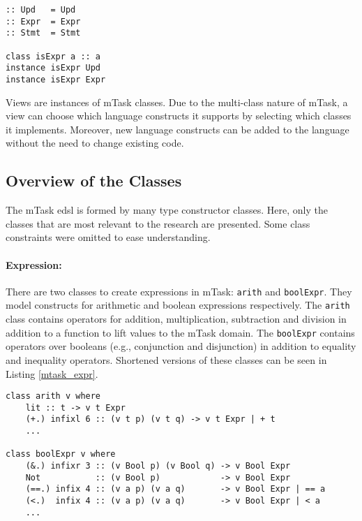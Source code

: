 \begin{lstlisting}[caption=mTask construction roles, captionpos=b,label=mtask_roles]
:: Upd   = Upd
:: Expr  = Expr
:: Stmt  = Stmt

class isExpr a :: a
instance isExpr Upd
instance isExpr Expr
\end{lstlisting}

Views are instances of mTask classes. Due to the multi-class nature of mTask, a view can choose which language constructs it supports by selecting which classes it implements. Moreover, new language constructs can be added to the language without the need to change existing code. 


\subsection{Overview of the Classes}\label{sec:mtask_classes}

The mTask \ac{edsl} is formed by many type constructor classes. Here, only the classes that are most relevant to the research are presented. Some class constraints were omitted to ease understanding.

\paragraph{Expression:} There are two classes to create expressions in mTask: \texttt{arith} and \texttt{boolExpr}. They model constructs for arithmetic and boolean expressions respectively. The \texttt{arith} class contains operators for addition, multiplication, subtraction and division in addition to a function to lift values to the mTask domain. The \texttt{boolExpr} contains operators over booleans (e.g., conjunction and disjunction) in addition to equality and inequality operators. Shortened versions of these classes can be seen in Listing \ref{mtask_expr}. 

\begin{lstlisting}[caption=mTask expression classes,captionpos=b,label=mtask_expr]
class arith v where
	lit :: t -> v t Expr 
	(+.) infixl 6 :: (v t p) (v t q) -> v t Expr | + t
	...

class boolExpr v where
	(&.) infixr 3 :: (v Bool p) (v Bool q) -> v Bool Expr 
	Not           :: (v Bool p)            -> v Bool Expr 
	(==.) infix 4 :: (v a p) (v a q)       -> v Bool Expr | == a
	(<.)  infix 4 :: (v a p) (v a q)       -> v Bool Expr | < a
	...
\end{lstlisting}

